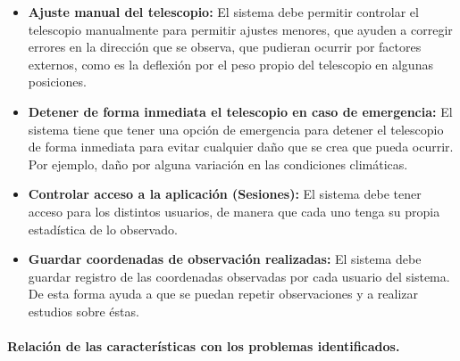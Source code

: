 \documentclass[letterpaper,spanish,10pt]{article}
\begin{document}
\begin{itemize}
	\item \textbf{Ajuste manual del telescopio:} El sistema debe permitir controlar el 
telescopio manualmente para permitir ajustes menores, que ayuden a corregir errores 
en la direcci\'on que se observa, que pudieran ocurrir por factores externos, como 
es la deflexi\'on por el peso propio del telescopio en algunas posiciones.

	\item \textbf{Detener de forma inmediata el telescopio en caso de emergencia:} El 
sistema tiene que tener una opci\'on de emergencia para detener el telescopio de 
forma inmediata para evitar cualquier da\~no que se crea que pueda ocurrir. Por 
ejemplo, da\~no por alguna variaci\'on en las condiciones clim\'aticas.

	\item \textbf{Controlar acceso a la aplicaci\'on (Sesiones):} El sistema debe tener 
acceso para los distintos usuarios, de manera que cada uno tenga su propia 
estad\'istica de lo observado.

	\item \textbf{Guardar coordenadas de observaci\'on realizadas:} El sistema debe 
guardar registro de las coordenadas observadas por cada usuario del sistema. De 
esta forma ayuda a que se puedan repetir observaciones y a realizar estudios sobre 
\'estas.

	\end{itemize}


\newpage

\paragraph{Relaci\'on de las caracter\'isticas con los problemas identificados.}
\end{document}
